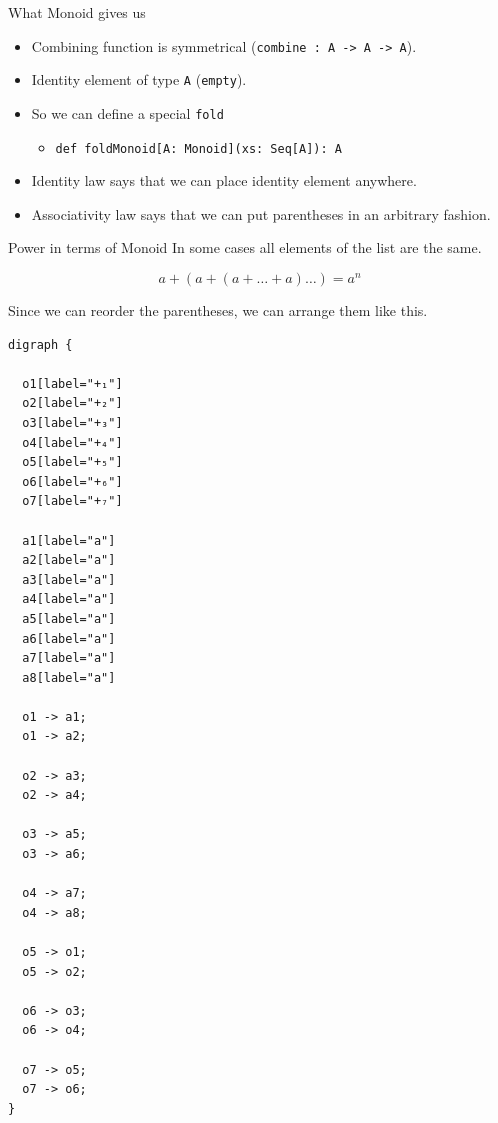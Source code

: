 \documentclass[presentation,aspectratio=169,smaller]{beamer}
\begin{document}
\begin{frame}[label={sec:org58280d8},fragile]{What Monoid gives us}
 \begin{itemize}
\item <1-> Combining function is symmetrical (\texttt{combine : A -> A -> A}).
\item <2-> Identity element of type \texttt{A} (\texttt{empty}).
\item <3-> So we can define a special \texttt{fold}
\begin{itemize}
\item \texttt{def foldMonoid[A: Monoid](xs: Seq[A]): A}
\end{itemize}
\item <4-> Identity law says that we can place identity element anywhere.
\item <5-> Associativity law says that we can put parentheses in an arbitrary fashion.
\end{itemize}
\end{frame}

\begin{frame}[label={sec:orgb9e8ff2},fragile]{Power in terms of Monoid}
 In some cases all elements of the list are the same.

\pause
\begin{equation*}
  a + (a + (a + \ldots + a) \ldots ) = a ^ n
\end{equation*}

\pause

Since we can reorder the parentheses, we can arrange them like this.

\pause

\begin{verbatim}
digraph {

  o1[label="+₁"]
  o2[label="+₂"]
  o3[label="+₃"]
  o4[label="+₄"]
  o5[label="+₅"]
  o6[label="+₆"]
  o7[label="+₇"]

  a1[label="a"]
  a2[label="a"]
  a3[label="a"]
  a4[label="a"]
  a5[label="a"]
  a6[label="a"]
  a7[label="a"]
  a8[label="a"]

  o1 -> a1;
  o1 -> a2;

  o2 -> a3;
  o2 -> a4;

  o3 -> a5;
  o3 -> a6;

  o4 -> a7;
  o4 -> a8;

  o5 -> o1;
  o5 -> o2;

  o6 -> o3;
  o6 -> o4;

  o7 -> o5;
  o7 -> o6;
}
\end{verbatim}
\end{frame}
\end{document}
